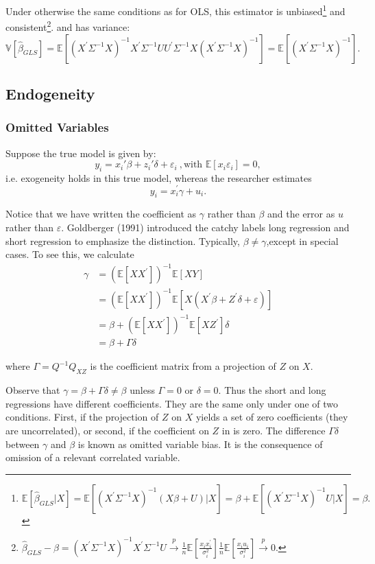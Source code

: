 Under otherwise the same conditions as for OLS, this estimator is unbiased\footnote{$\mathbb{E}\left[\hat{\beta}_{GLS}|X\right] = \mathbb{E}\left[\left(X^{\prime} \Sigma^{-1} X\right)^{-1}(X\beta+U)|X \right] = \beta + \mathbb{E}\left[\left(X^{\prime} \Sigma^{-1} X\right)^{-1}U|X\right]=\beta.$} 
and consistent\footnote{$\hat{\beta}_{GLS} - \beta = (X^{\prime} \Sigma^{-1} X)^{-1}X^{\prime} \Sigma^{-1} U \overset{p}{\rightarrow} \frac{1}{n}\mathbb{E}\left[\frac{x_i x_i^{\prime}}{\sigma_i^2}\right] \frac{1}{n}\mathbb{E}\left[\frac{x_i u_i}{\sigma_i^2}\right] \overset{p}{\rightarrow} 0.$}.
and has variance: 
\[
\mathbb{V}[\hat{\beta}_{GLS}] = \mathbb{E}\left[(X^{\prime} \Sigma^{-1} X)^{-1} X^{\prime} \Sigma^{-1} U U^{\prime} \Sigma^{-1} X (X^{\prime} \Sigma^{-1} X)^{-1}\right] = \mathbb{E}\left[(X^{\prime} \Sigma^{-1} X)^{-1}\right].
\]

\subsection{Endogeneity}
\subsubsection{Omitted Variables}
Suppose the true model is given by:
$$y_i=x_i'\beta+z_i'\delta+\varepsilon_i\:,\text{with } \mathbb{E}[x_i\varepsilon_i]=0,$$
i.e. exogeneity holds in this true model, whereas the researcher estimates
$$y_i = x_i^{\prime} \gamma+u_i.$$

Notice that we have written the coefficient as $\gamma$ rather than $\beta$ and the error as $u$ rather than $\varepsilon .$ Goldberger (1991) introduced the catchy labels long regression and short regression to emphasize the distinction.
Typically, $\beta\neq\gamma$,except in special cases. To see this, we calculate
\begin{align*}
  \gamma&=\left(\mathbb{E}\left[XX^{\prime}\right]\right)^{-1}\mathbb{E}\left[XY\right]\\
  &=\left(\mathbb{E}\left[X X^{\prime}\right]\right)^{-1}\mathbb{E}\left[X \left(X^{\prime}\beta + Z^{\prime}\delta+\varepsilon\right)\right]\\
  &=\beta+\left(\mathbb{E}\left[X X^{\prime}\right]\right)^{-1}\mathbb{E}\left[X Z^{\prime}\right]\delta\\
  &=\beta+\Gamma\delta
\end{align*}

where $\Gamma=Q^{-1}Q_{XZ}$ is the coefficient matrix from a projection of $Z$ on $X$.

Observe that $\gamma=\beta+\Gamma\delta\neq\beta$ unless $\Gamma=0$ or $\delta=0.$ Thus the short and long regressions have different coefficients. 
They are the same only under one of two conditions. 
First, if the projection of $Z$ on $X$ yields a set of zero coefficients (they are uncorrelated), 
or second, if the coefficient on $Z$ in is zero. 
The difference $\Gamma\delta$ between $\gamma$ and $\beta$ is known as omitted variable bias. 
It is the consequence of omission of a relevant correlated variable.

